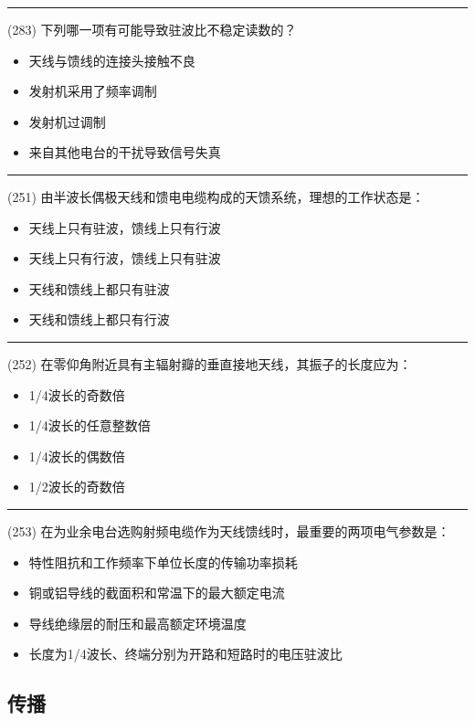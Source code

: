 \documentclass[twocolumn,hyperref,UTF8]{ctexart}  %
\begin{document}
\noindent\rule{0.5\textwidth}{1pt}
\heiti (283) 下列哪一项有可能导致驻波比不稳定读数的？ \songti {\color{gray} [LK1223] }
\begin{itemize}
	\item  天线与馈线的连接头接触不良
	\item  发射机采用了频率调制
	\item  发射机过调制
	\item  来自其他电台的干扰导致信号失真
\end{itemize}


\noindent\rule{0.5\textwidth}{1pt}
\heiti (251) 由半波长偶极天线和馈电电缆构成的天馈系统，理想的工作状态是： \songti {\color{gray} [LK0702] }
\begin{itemize}
	\item  天线上只有驻波，馈线上只有行波
	\item  天线上只有行波，馈线上只有驻波
	\item  天线和馈线上都只有驻波
	\item  天线和馈线上都只有行波
\end{itemize}


\noindent\rule{0.5\textwidth}{1pt}
\heiti (252) 在零仰角附近具有主辐射瓣的垂直接地天线，其振子的长度应为： \songti {\color{gray} [LK0904] }
\begin{itemize}
	\item  1/4波长的奇数倍
	\item  1/4波长的任意整数倍
	\item  1/4波长的偶数倍
	\item  1/2波长的奇数倍
\end{itemize}


\noindent\rule{0.5\textwidth}{1pt}
\heiti (253) 在为业余电台选购射频电缆作为天线馈线时，最重要的两项电气参数是： \songti {\color{gray} [LK0910] }
\begin{itemize}
	\item  特性阻抗和工作频率下单位长度的传输功率损耗
	\item  铜或铝导线的截面积和常温下的最大额定电流
	\item  导线绝缘层的耐压和最高额定环境温度
	\item  长度为1/4波长、终端分别为开路和短路时的电压驻波比
\end{itemize}



\clearpage
\subsection{传播}
\end{document}
